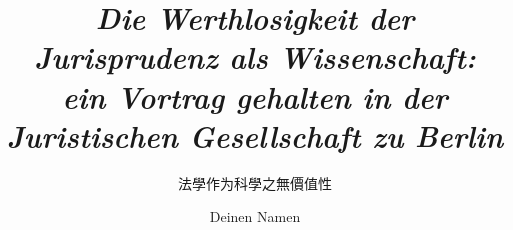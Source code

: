 \documentclass[
aspectratio=169,	%
LETI,				%
english,			%
]{DEEclassP}
\title[法學作为科學之無價值性]{\textit{Die Werthlosigkeit der Jurisprudenz als Wissenschaft:
\\ein Vortrag gehalten in der Juristischen Gesellschaft zu
Berlin}}
\subtitle{法學作为科學之無價值性\footfullcite{kirchmann1848werthlosigkeit}}
\author[Deinen Namen]{Deinen Namen}	%
\begin{document}
	\maketitlepage

\end{document}
